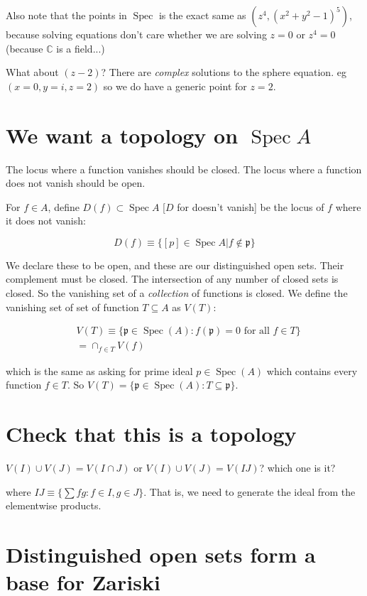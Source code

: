 \documentclass{book}
\newcommand{\C}{\ensuremath{\mathbb{C}}}
\newcommand{\Spec}{\operatorname{Spec}}
\newcommand{\spec}{\operatorname{Spec}}
\newcommand{\p}{\mathfrak{p}}
\theoremstyle{definition}
\begin{document}
Also note that the points in $\spec$ is the exact same as $(z^4, (x^2 + y^2 - 1)^5)$,
because solving equations don't care whether we are solving $z = 0$ or
$z^4 = 0$ (because $\C$ is a field...)


What about $(z - 2)$? There are \emph{complex} solutions to the sphere
equation. eg $(x = 0, y = i, z = 2)$ so we do have a generic point for $z = 2$.


\section{We want a topology on $\spec A$}
The locus where a function vanishes should be closed. The locus where a function
does not vanish should be open.

For $f \in A$, define $D(f) \subset \spec A$ [$D$ for doesn't vanish] be the
locus of $f$ where it does not vanish:

$$
D(f) \equiv \{ [p] \in \spec A | f \not \in \p \}
$$

We declare these to be open, and these are our distinguished open sets.
Their complement must be closed. The intersection of any number of closed
sets is closed. So the vanishing set of a \emph{collection} of functions
is closed. We define the vanishing set of  set of function $T \subseteq A$
as $V(T)$:

\begin{align*}
&V(T) \equiv
\{ \p \in \Spec(A) : f(\p) = 0 \text{ for all } f \in T \} \\
&= \cap_{f \in T} V(f)
\end{align*}


which is the same as asking for prime ideal $p \in \Spec(A)$ which contains
every function $f \in T$. So $V(T) = \{ \p \in \Spec(A): T \subseteq \p \}$.

\section{Check that this is a topology}
$V(I) \cup V(J) = V(I \cap J)$ or $V(I) \cup V(J) = V(IJ)$? which one is it?

where $IJ \equiv \{ \sum fg : f \in I, g \in J\}$. That is, we need to generate
the ideal from the elementwise products.

\section{Distinguished open sets form a base for Zariski}
\end{document}
